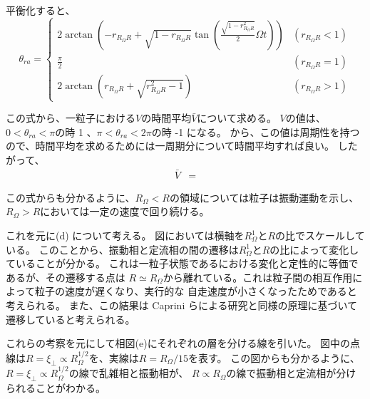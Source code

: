 \documentclass[/Users/ikedahajime/GitHub/reserch/master_report/thesis]{subfiles}
\begin{document}
平衡化すると、
\begin{equation}\label{eq:cabp_single_ring}
    \theta_{ra}=
    \begin{cases}
        2 \arctan(-r_{R_\Omega R}+\sqrt{1-r_{R_\Omega R}}\tan (\frac{\sqrt{1-r_{R_\Omega R}^2}}{2}\Omega t))&(r_{R_\Omega R}<1)\\
        \frac{\pi}{2} &(r_{R_\Omega R}=1)\\
        2 \arctan(r_{R_\Omega R}+\sqrt{r_{R_\Omega R}^2-1})& (r_{R_\Omega R}>1)
    \end{cases}
\end{equation}

この式から、一粒子における$V$の時間平均$\bar{V}$について求める。
$V$の値は、$0<\theta_{ra}<\pi$の時 1 、$\pi<\theta_{ra}<2\pi$の時 -1 になる。
から、この値は周期性を持つので、時間平均を求めるためには一周期分について時間平均すれば良い。
したがって、
\begin{align}
    \bar{V}&=
\end{align}


この式からも分かるように、$R_\Omega<R$の領域については粒子は振動運動を示し、
$R_\Omega>R$においては一定の速度で回り続ける。

これを元に(d) について考える。
図においては横軸を$R_\Omega^1$と$R$の比でスケールしている。
このことから、振動相と定流相の間の遷移は$R_\Omega^1$と$R$の比によって変化していることが分かる。
これは一粒子状態であるにおける変化と定性的に等価であるが、その遷移する点は
$R\simeq R_\Omega$から離れている。これは粒子間の相互作用によって粒子の速度が遅くなり、実行的な
自走速度が小さくなったためであると考えられる。
また、この結果は Caprini らによる研究\cite{capriniSelfrevertingVorticesChiral2024}と同様の原理に基づいて
遷移していると考えられる。

これらの考察を元にして相図(e)にそれぞれの層を分ける線を引いた。
図中の点線は$R=\xi_\bot\propto R_\Omega^{1/2}$を、実線は$R= R_\Omega/15$を表す。
この図からも分かるように、$R=\xi_\bot\propto R_\Omega^{1/2}$の線で乱雑相と振動相が、
$R\propto R_\Omega$の線で振動相と定流相が分けられることがわかる。
\end{document}

